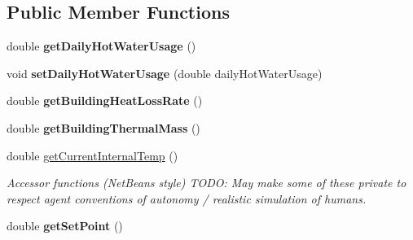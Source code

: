 \subsection*{Public Member Functions}
\begin{DoxyCompactItemize}
\item 
\hypertarget{classuk_1_1ac_1_1dmu_1_1iesd_1_1cascade_1_1agents_1_1prosumers_1_1_household_prosumer_a09a789d7a349ecd5833fd6e0a1548a93}{double {\bfseries get\-Daily\-Hot\-Water\-Usage} ()}\label{classuk_1_1ac_1_1dmu_1_1iesd_1_1cascade_1_1agents_1_1prosumers_1_1_household_prosumer_a09a789d7a349ecd5833fd6e0a1548a93}

\item 
\hypertarget{classuk_1_1ac_1_1dmu_1_1iesd_1_1cascade_1_1agents_1_1prosumers_1_1_household_prosumer_a3bb60f5c9b583c553f3062ff781a7ee5}{void {\bfseries set\-Daily\-Hot\-Water\-Usage} (double daily\-Hot\-Water\-Usage)}\label{classuk_1_1ac_1_1dmu_1_1iesd_1_1cascade_1_1agents_1_1prosumers_1_1_household_prosumer_a3bb60f5c9b583c553f3062ff781a7ee5}

\item 
\hypertarget{classuk_1_1ac_1_1dmu_1_1iesd_1_1cascade_1_1agents_1_1prosumers_1_1_household_prosumer_a960e93006daeed79156f286b5e585903}{double {\bfseries get\-Building\-Heat\-Loss\-Rate} ()}\label{classuk_1_1ac_1_1dmu_1_1iesd_1_1cascade_1_1agents_1_1prosumers_1_1_household_prosumer_a960e93006daeed79156f286b5e585903}

\item 
\hypertarget{classuk_1_1ac_1_1dmu_1_1iesd_1_1cascade_1_1agents_1_1prosumers_1_1_household_prosumer_a1c528641a668bbfb83ce984a591a7cec}{double {\bfseries get\-Building\-Thermal\-Mass} ()}\label{classuk_1_1ac_1_1dmu_1_1iesd_1_1cascade_1_1agents_1_1prosumers_1_1_household_prosumer_a1c528641a668bbfb83ce984a591a7cec}

\item 
\hypertarget{classuk_1_1ac_1_1dmu_1_1iesd_1_1cascade_1_1agents_1_1prosumers_1_1_household_prosumer_a38e515b406a8558e205cd751894aec9d}{double \hyperlink{classuk_1_1ac_1_1dmu_1_1iesd_1_1cascade_1_1agents_1_1prosumers_1_1_household_prosumer_a38e515b406a8558e205cd751894aec9d}{get\-Current\-Internal\-Temp} ()}\label{classuk_1_1ac_1_1dmu_1_1iesd_1_1cascade_1_1agents_1_1prosumers_1_1_household_prosumer_a38e515b406a8558e205cd751894aec9d}

\begin{DoxyCompactList}\small\item\em Accessor functions (Net\-Beans style) T\-O\-D\-O\-: May make some of these private to respect agent conventions of autonomy / realistic simulation of humans. \end{DoxyCompactList}\item 
\hypertarget{classuk_1_1ac_1_1dmu_1_1iesd_1_1cascade_1_1agents_1_1prosumers_1_1_household_prosumer_a88148ac9c3a524f52df5dce9a4bbf090}{double {\bfseries get\-Set\-Point} ()}\label{classuk_1_1ac_1_1dmu_1_1iesd_1_1cascade_1_1agents_1_1prosumers_1_1_household_prosumer_a88148ac9c3a524f52df5dce9a4bbf090}


\end{DoxyCompactItemize}
